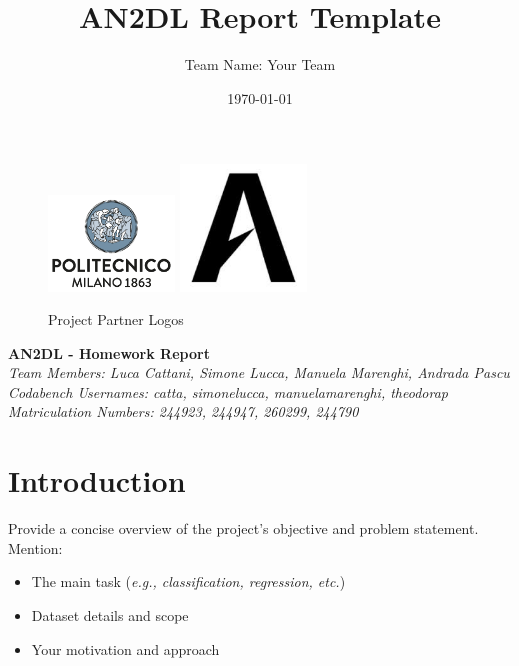 \documentclass[11pt]{article}
\title{AN2DL Report Template}
\author{Team Name: Your Team}
\date{\today}
\begin{document}
\maketitle

\begin{figure}[H]
    \centering
    \includegraphics[width=0.3\textwidth]{polimi.png} \hfill
    \includegraphics[width=0.3\textwidth]{airlab.jpeg}
    \caption{Project Partner Logos}
\end{figure}

\begin{center}
    \textbf{AN2DL - Homework Report}\\
    \textit{Team Members: Luca Cattani, Simone Lucca, Manuela Marenghi, Andrada Pascu}\\
    \textit{Codabench Usernames: catta, simonelucca, manuelamarenghi, theodorap}\\
    \textit{Matriculation Numbers: 244923, 244947, 260299, 244790}\\
\end{center}

\vspace{1cm}

\section{Introduction}
Provide a concise overview of the project’s objective and problem statement. Mention:
\begin{itemize}
    \item The main task (\textit{e.g., classification, regression, etc.})
    \item Dataset details and scope
    \item Your motivation and approach
\end{itemize}
\end{document}

